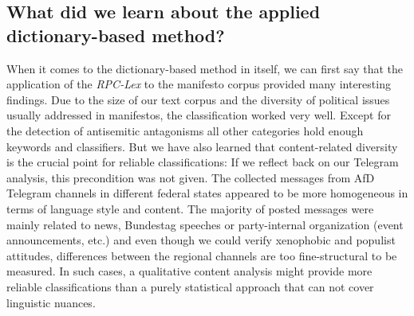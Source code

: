 \documentclass[a4paper]{scrreprt}
\begin{document}
\subsection*{What did we learn about the applied dictionary-based method?}
When it comes to the dictionary-based method in itself, we can first say that the application of the {\em RPC-Lex} to the manifesto corpus provided many interesting findings. Due to the size of our text corpus and the diversity of political issues usually addressed in manifestos, the classification worked very well. Except for the detection of antisemitic antagonisms all other categories hold enough keywords and classifiers. But we have also learned that content-related diversity is the crucial point for reliable classifications: If we reflect back on our Telegram analysis, this precondition was not given. The collected messages from AfD Telegram channels in different federal states appeared to be more homogeneous in terms of language style and content. The majority of posted messages were mainly related to news, Bundestag speeches or party-internal organization (event announcements, etc.) and even though we could verify xenophobic and populist attitudes, differences between the regional channels are too fine-structural to be measured. In such cases, a qualitative content analysis might provide more reliable classifications than a purely statistical approach that can not cover linguistic nuances.


\end{document}
